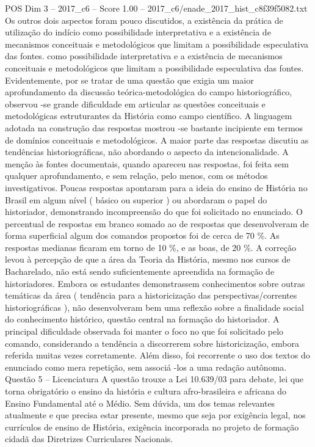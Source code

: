 \begin{textsample}{POS Dim 3 – 2017\_c6 – Score 1.00 – 2017\_c6/enade\_2017\_hist\_c8f39f5082.txt}
Os outros dois aspectos foram pouco discutidos, a existência da prática de utilização do indício como possibilidade interpretativa e a existência de mecanismos conceituais e metodológicos que limitam a possibilidade especulativa das fontes. como possibilidade interpretativa e a existência de mecanismos conceituais e metodológicos que limitam a possibilidade especulativa das fontes.
Evidentemente, por se tratar de uma questão que exigia um maior aprofundamento da discussão teórica-metodológica do campo historiográfico, observou -se grande dificuldade em articular as questões conceituais e metodológicas estruturantes da História como campo científico.
A linguagem adotada na construção das respostas mostrou -se bastante incipiente em termos de domínios conceituais e metodológicos.
A maior parte das respostas discutiu as tendências historiográficas, não abordando o aspecto da intencionalidade.
A menção às fontes documentais, quando apareceu nas respostas, foi feita sem qualquer aprofundamento, e sem relação, pelo menos, com os métodos investigativos.
Poucas respostas apontaram para a ideia do ensino de História no Brasil em algum nível ( básico ou superior ) ou abordaram o papel do historiador, demonstrando incompreensão do que foi solicitado no enunciado.
O percentual de respostas em branco somado ao de respostas que desenvolveram de forma superficial algum dos comandos propostos foi de cerca de 70 \%.
As respostas medianas ficaram em torno de 10 \%, e as boas, de 20 \%.
A correção levou à percepção de que a área da Teoria da História, mesmo nos cursos de Bacharelado, não está sendo suficientemente apreendida na formação de historiadores.
Embora os estudantes demonstrassem conhecimentos sobre outras temáticas da área ( tendência para a historicização das perspectivas/correntes historiográficas ), não desenvolveram bem uma reflexão sobre a finalidade social do conhecimento histórico, questão central na formação do historiador.
A principal dificuldade observada foi manter o foco no que foi solicitado pelo comando, considerando a tendência a discorrerem sobre historicização, embora referida muitas vezes corretamente.
Além disso, foi recorrente o uso dos textos do enunciado como mera repetição, sem associá -los a uma redação autônoma.
Questão 5 – Licenciatura A questão trouxe a Lei 10.639/03 para debate, lei que torna obrigatório o ensino da história e cultura afro-brasileira e africana do Ensino Fundamental até o Médio.
Sem dúvida, um dos temas relevantes atualmente e que precisa estar presente, mesmo que seja por exigência legal, nos currículos de ensino de História, exigência incorporada no projeto de formação cidadã das Diretrizes Curriculares Nacionais.

\end{textsample}
